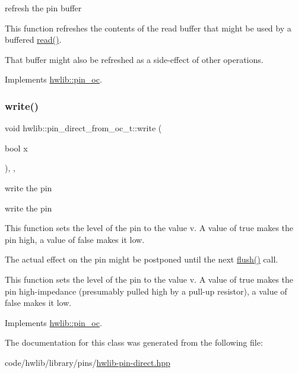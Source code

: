 refresh the pin buffer

This function refreshes the contents of the read buffer that might be used by a buffered \hyperlink{classhwlib_1_1pin__direct__from__oc__t_af9243ffeb3095cefb13b7a3daf209339}{read()}.

That buffer might also be refreshed as a side-\/effect of other operations. 

Implements \hyperlink{classhwlib_1_1pin__oc_a573740f6f790c5792efc9cdd44cc73b3}{hwlib\+::pin\+\_\+oc}.

\mbox{\label{classhwlib_1_1pin__direct__from__oc__t_a46ed21095c419bb3a8b720f3a8b00811}} 
\subsubsection{\texorpdfstring{write()}{write()}}
{\footnotesize\ttfamily void hwlib\+::pin\+\_\+direct\+\_\+from\+\_\+oc\+\_\+t\+::write (\begin{DoxyParamCaption}\item[{bool}]{x }\end{DoxyParamCaption})\hspace{0.3cm}{\ttfamily [inline]}, {\ttfamily [override]}, {\ttfamily [virtual]}}





write the pin

write the pin

This function sets the level of the pin to the value v. A value of true makes the pin high, a value of false makes it low.

The actual effect on the pin might be postponed until the next \hyperlink{classhwlib_1_1pin__direct__from__oc__t_a3009f8da456f04e889ee1d81e8bcf0b4}{flush()} call.

This function sets the level of the pin to the value v. A value of true makes the pin high-\/impedance (presumably pulled high by a pull-\/up resistor), a value of false makes it low. 

Implements \hyperlink{classhwlib_1_1pin__oc_a4429dd7dc80858a213bb157f4ac5def3}{hwlib\+::pin\+\_\+oc}.



The documentation for this class was generated from the following file\+:\begin{DoxyCompactItemize}
\item 
code/hwlib/library/pins/\hyperlink{hwlib-pin-direct_8hpp}{hwlib-\/pin-\/direct.\+hpp}\end{DoxyCompactItemize}
